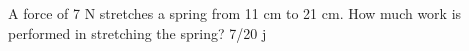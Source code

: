 {A force of 7 N stretches a spring from 11 cm to 21 cm. How much work is performed in stretching the spring?}
{7/20 j}
